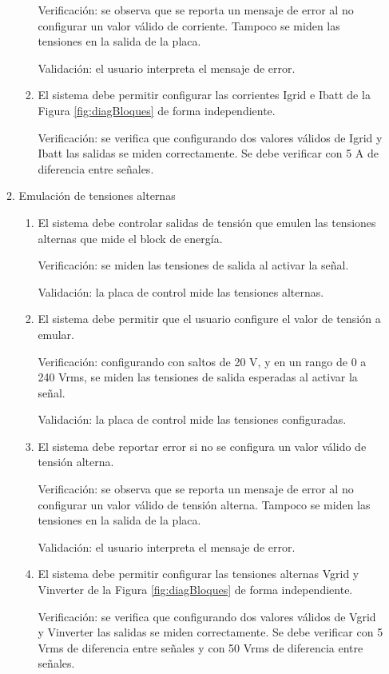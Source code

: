 \documentclass[
11pt, %
codirector, %
]{charter}
\begin{document}
\begin{enumerate}
\begin{enumerate}
\begin{enumerate}
			                  Verificación: se observa que se reporta un mensaje de error al no configurar un valor válido de corriente. Tampoco se miden las tensiones en la salida de la placa.

			                  Validación: el usuario interpreta el mensaje de error.
			            \item El sistema debe permitir configurar las corrientes Igrid e Ibatt de la Figura \ref{fig:diagBloques} de forma independiente.

			                  Verificación: se verifica que configurando dos valores válidos de Igrid y Ibatt las salidas se miden correctamente. Se debe verificar con 5 A de diferencia entre señales.
		            \end{enumerate}
		      \item Emulación de tensiones alternas
		            \begin{enumerate}
			            \item El sistema debe controlar salidas de tensión que emulen las tensiones alternas que mide el block de energía.

			                  Verificación: se miden las tensiones de salida al activar la señal.

			                  Validación: la placa de control mide las tensiones alternas.
			            \item El sistema debe permitir que el usuario configure el valor de tensión a emular.

			                  Verificación: configurando con saltos de 20 V, y en un rango de 0 a 240 Vrms, se miden las tensiones de salida esperadas al activar la señal.

			                  Validación: la placa de control mide las tensiones configuradas.
			            \item El sistema debe reportar error si no se configura un valor válido de tensión alterna.

			                  Verificación: se observa que se reporta un mensaje de error al no configurar un valor válido de tensión alterna. Tampoco se miden las tensiones en la salida de la placa.

			                  Validación: el usuario interpreta el mensaje de error.
			            \item El sistema debe permitir configurar las tensiones alternas Vgrid y Vinverter de la Figura \ref{fig:diagBloques} de forma independiente.

			                  Verificación: se verifica que configurando dos valores válidos de Vgrid y Vinverter las salidas se miden correctamente. Se debe verificar con 5 Vrms de diferencia entre señales y con 50 Vrms de diferencia entre señales.


\end{enumerate}
\end{enumerate}
\end{enumerate}
\end{document}
